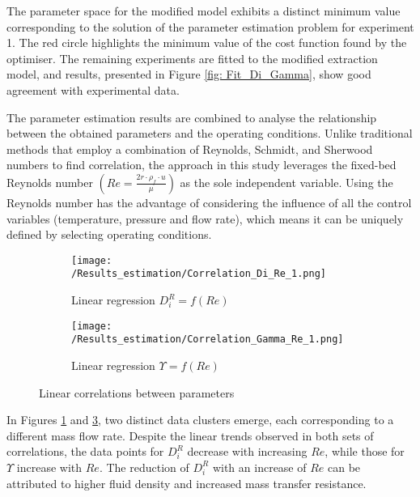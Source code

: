\documentclass[../Supercritical_fluid_extraction_of_essential_oil_from_chamomile.tex]{subfiles}
\begin{document}
	The parameter space for the modified model exhibits a distinct minimum value corresponding to the solution of the parameter estimation problem for experiment 1. The red circle highlights the minimum value of the cost function found by the optimiser. The remaining experiments are fitted to the modified extraction model, and results, presented in Figure \ref{fig: Fit_Di_Gamma}, show good agreement with experimental data. 
		
	The parameter estimation results are combined to analyse the relationship between the obtained parameters and the operating conditions. Unlike traditional methods that employ a combination of Reynolds, Schmidt, and Sherwood numbers to find correlation, the approach in this study leverages the fixed-bed Reynolds number $\left(Re = \frac{2r \cdot \rho_f \cdot u}{\mu}\right)$ as the sole independent variable. Using the Reynolds number has the advantage of considering the influence of all the control variables (temperature, pressure and flow rate), which means it can be uniquely defined by selecting operating conditions.	
	
	\begin{figure}[!h]
		\centering
		\begin{subfigure}{0.9\columnwidth}
			\centering
			\texttt{[image: /Results\_estimation/Correlation\_Di\_Re\_1.png]}
			\caption{Linear regression $D_i^R = f(Re)$}
			\label{fig: Correlations_Di_Re}
		\end{subfigure}
		\hfill
		\begin{subfigure}{0.9\columnwidth}
			\centering
			\texttt{[image: /Results\_estimation/Correlation\_Gamma\_Re\_1.png]}
			\caption{Linear regression $\Upsilon = f(Re)$}
			\label{fig: Correlations_Gamma_Re}
		\end{subfigure}
		\caption{Linear correlations between parameters}
	\end{figure}
	
	In Figures \ref{fig: Correlations_Di_Re} and \ref{fig: Correlations_Gamma_Re}, two distinct data clusters emerge, each corresponding to a different mass flow rate. Despite the linear trends observed in both sets of correlations, the data points for $D_i^R$ decrease with increasing $Re$, while those for $\Upsilon$ increase with $Re$. The reduction of $D_i^R$ with an increase of $Re$ can be attributed to higher fluid density and increased mass transfer resistance.
	
\end{document}

